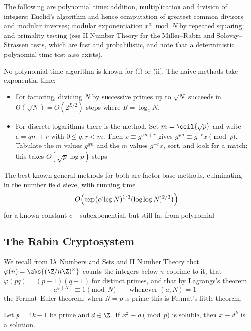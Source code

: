 \begin{example}
	The following are polynomial time: addition, multiplication and division of integers; Euclid's algorithm and hence computation of greatest common divisors and modular inverses; modular exponentiation $x^\alpha \bmod N$ by repeated squaring; and primality testing (see II Number Theory for the Miller--Rabin and Solovay--Strassen tests, which are fast and probabilistic, and note that a deterministic polynomial time test also exists).

	No polynomial time algorithm is known for (i) or (ii). The naive methods take exponential time:
	\begin{itemize}
		\item For factoring, dividing $N$ by successive primes up to $\sqrt N$ succeeds in $O(\sqrt N) = O(2^{B/2})$ steps where $B = \log_2N$.
		\item For discrete logarithms there is the  method. Set $m = \ceil{\sqrt p}$ and write $a = qm+r$ with $0 \le q,r<m$. Then $x \equiv g^{qm+r}$ gives $g^{qm}\equiv g^{-r}x \pmod p$. Tabulate the $m$ values $g^{qm}$ and the $m$ values $g^{-r}x$, sort, and look for a match; this takes $O(\sqrt p\log p)$ steps.
	\end{itemize}
	The best known general methods for both are factor base methods, culminating in the number field sieve, with running time
	$$O\Bigl(\exp\bigl(c(\log N)^{1/3}(\log\log N)^{2/3}\bigr)\Bigr)$$
	for a known constant $c$ -- subexponential, but still far from polynomial.
\end{example}

\subsection{The Rabin Cryptosystem}

We recall from IA Numbers and Sets and II Number Theory that  $\varphi(n) = \abs{(\Z/n\Z)^\times}$ counts the integers below $n$ coprime to it, that $\varphi(pq) = (p-1)(q-1)$ for distinct primes, and that by Lagrange's theorem
$$a^{\varphi(N)}\equiv1\pmod N \qquad \text{whenever } (a,N)=1,$$
the Fermat--Euler theorem; when $N=p$ is prime this is Fermat's little theorem.

\begin{lemma}\label{lem:sqrt3mod4}
	Let $p = 4k-1$ be prime and $d \in \Z$. If $x^2\equiv d\pmod p$ is soluble, then $x \equiv d^k$ is a solution.
\end{lemma}

